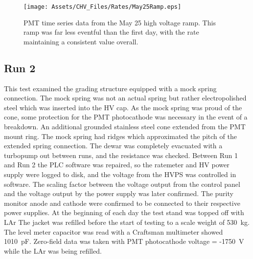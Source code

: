 

\begin{figure}
\begin{center}
\texttt{[image: Assets/CHV\_Files/Rates/May25Ramp.eps]}
\end{center}
\caption[PMT time series data from the CHV Prototype - May 25 high voltage ramp.]%
{PMT time series data from the May 25 high voltage ramp.
This ramp was far less eventful than the first day, with the rate maintaining a consistent value overall.}
\end{figure}



\subsection{Run 2}
\label{sec:chv_run2}

This test examined the grading structure equipped with a mock spring connection.
The mock spring was not  an actual spring but rather electropolished steel which was inserted into the HV cap. 
As the mock spring was proud of the cone, some protection for the PMT photocathode was necessary in the event of a breakdown.
An additional grounded stainless steel cone extended from the PMT mount ring.
The mock spring had ridges which approximated the pitch of the extended spring connection.
The dewar was completely evacuated with a turbopump out between runs, and the resistance was checked.
Between Run 1 and Run 2 the PLC software was repaired, so the ratemeter and HV power supply were logged to disk, and the voltage from the HVPS was controlled in software.
The scaling factor between the voltage output from the control panel and the voltage output by the power supply was later confirmed.
The purity monitor anode and cathode were confirmed to be connected to their respective power supplies. 
At the beginning of each day the test stand was topped off with LAr
The jacket was refilled before the start of testing to a scale weight of 530~kg.
The level meter capacitor was read with a Craftsman multimeter showed 1010~pF.  
Zero-field data was taken with  PMT photocathode voltage = -1750~V while the LAr was being refilled.


